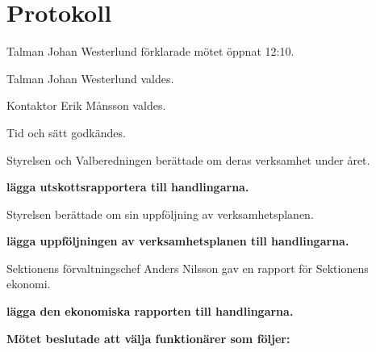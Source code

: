 \documentclass[10pt]{article}
\def\mo{Johan Westerlund}
\def\ms{Erik Månsson}
\begin{document}
\section*{Protokoll}
\begin{paragrafer}
Talman {\mo} förklarade mötet öppnat 12:10.

Talman {\mo} valdes.

Kontaktor {\ms} valdes.

Tid och sätt godkändes.

\valavj






Styrelsen och Valberedningen berättade om deras verksamhet under året.

\textbf{\Mba lägga utskottsrapportera till handlingarna.}

Styrelsen berättade om sin uppföljning av verksamhetsplanen.

\textbf{\Mba lägga uppföljningen av verksamhetsplanen till handlingarna.}

Sektionens förvaltningschef Anders Nilsson gav en rapport för Sektionens ekonomi.

\textbf{\Mba lägga den ekonomiska rapporten till handlingarna.}

\begin{paragrafer}
    \textbf{Mötet beslutade att välja funktionärer som följer:}
\end{paragrafer}
\end{paragrafer}
\end{document}
